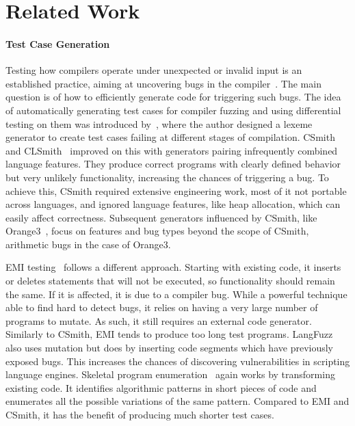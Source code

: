 \section{Related Work}\label{sec:rw}

\paragraph{Test Case Generation} 
Testing how compilers operate under unexpected or invalid input is an established practice, aiming at uncovering bugs in the compiler~\cite{Boujarwah1997}. The main question is of how to efficiently generate code for triggering such bugs. The idea of automatically generating test cases for compiler fuzzing and using differential testing on them was introduced by~\cite{McKeeman1998}, where the author designed a lexeme generator to create test cases failing at different stages of compilation. CSmith~\cite{Yang2011} and CLSmith~\cite{Lidbury2015a} improved on this with generators pairing infrequently combined language features. They produce correct programs with clearly defined behavior but very unlikely functionality, increasing the chances of triggering a bug. To achieve this, CSmith required extensive engineering work, most of it not portable across languages, and ignored language features, like heap allocation, which can easily affect correctness. Subsequent generators influenced by CSmith, like Orange3~\cite{Nagai2013}, focus on features and bug types beyond the scope of CSmith, arithmetic bugs in the case of Orange3.

EMI testing~\cite{Le2013a,Le2015,Sun2016a} follows a different approach. Starting with existing code, it inserts or deletes statements that will not be executed, so functionality should remain the same. If it is affected, it is due to a compiler bug. While a powerful technique able to find hard to detect bugs, it relies on having a very large number of programs to mutate. As such, it still requires an external code generator. Similarly to CSmith, EMI tends to produce too long test programs. LangFuzz~\cite{Holler2012} also uses mutation but does by inserting code segments which have previously exposed bugs. This increases the chances of discovering vulnerabilities in scripting language engines. Skeletal program enumeration~\cite{Zhang2016a} again works by transforming existing code. It identifies algorithmic patterns in short pieces of code and enumerates all the possible variations of the same pattern. Compared to EMI and CSmith, it has the benefit of producing much shorter test cases. 

